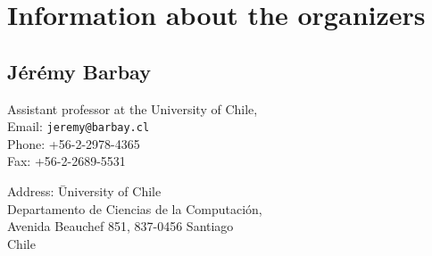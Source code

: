 \documentclass[a4paper,10pt]{article}
\begin{document}
\section{Information about the organizers}


\subsection*{J\'er\'emy Barbay}


\begin{multicols}{2}
\noindent Assistant professor at the University of Chile, \\
Email: \texttt{jeremy@barbay.cl} \\
Phone:  +56-2-2978-4365\\
Fax: +56-2-2689-5531
\begin{tabbing}
Address: \= University of Chile\\
\> Departamento de Ciencias de la Computación, \\
\> Avenida Beauchef 851, 837-0456 Santiago\\
\> Chile
\end{tabbing}
\end{multicols}
\end{document}
